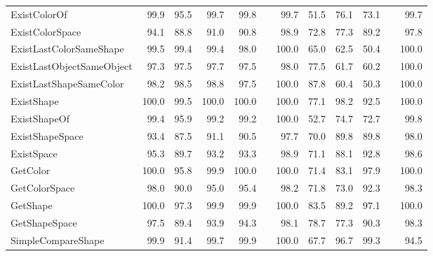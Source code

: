 \begin{table*}[htb]
\begin{adjustbox}{width=\columnwidth}
\begin{tabular}{l r r r r r r r r r r r}
			ExistColorOf    &    99.9    &    95.5    &    99.7    &    99.8    &    &    99.7    &    51.5    &    76.1    &    73.1    &   &    99.7    \\
			ExistColorSpace    &    94.1    &    88.8    &    91.0    &    90.8    &    &    98.9    &    72.8    &    77.3    &    89.2    &   &    97.8    \\
			ExistLastColorSameShape    &    99.5    &    99.4    &    99.4    &    98.0    &    &    100.0    &    65.0    &    62.5    &    50.4    &   &    100.0    \\
			ExistLastObjectSameObject    &    97.3    &    97.5    &    97.7    &    97.5    &    &    98.0    &    77.5    &    61.7    &    60.2    &   &    100.0    \\
			ExistLastShapeSameColor    &    98.2    &    98.5    &    98.8    &    97.5    &    &    100.0    &    87.8    &    60.4    &    50.3    &   &    100.0    \\
			ExistShape    &    100.0    &    99.5    &    100.0    &    100.0    &    &    100.0    &    77.1    &    98.2    &    92.5    &   &    100.0    \\
			ExistShapeOf    &    99.4    &    95.9    &    99.2    &    99.2    &    &    100.0    &    52.7    &    74.7    &    72.7    &   &    99.8    \\
			ExistShapeSpace    &    93.4    &    87.5    &    91.1    &    90.5    &    &    97.7    &    70.0    &    89.8    &    89.8    &   &    98.0    \\
			ExistSpace    &    95.3    &    89.7    &    93.2    &    93.3    &    &    98.9    &    71.1    &    88.1    &    92.8    &   &    98.6    \\
			GetColor    &    100.0    &    95.8    &    99.9    &    100.0    &    &    100.0    &    71.4    &    83.1    &    97.9    &   &    100.0    \\
			GetColorSpace    &    98.0    &    90.0    &    95.0    &    95.4    &    &    98.2    &    71.8    &    73.0    &    92.3    &   &    98.3    \\
			GetShape    &    100.0    &    97.3    &    99.9    &    99.9    &    &    100.0    &    83.5    &    89.2    &    97.1    &   &    100.0    \\
			GetShapeSpace    &    97.5    &    89.4    &    93.9    &    94.3    &    &    98.1    &    78.7    &    77.3    &    90.3    &   &    98.3    \\
			SimpleCompareShape    &    99.9    &    91.4    &    99.7    &    99.9    &    &    100.0    &    67.7    &    96.7    &    99.3    &   &    94.5    \\

\end{tabular}
\end{adjustbox}
\end{table*}
